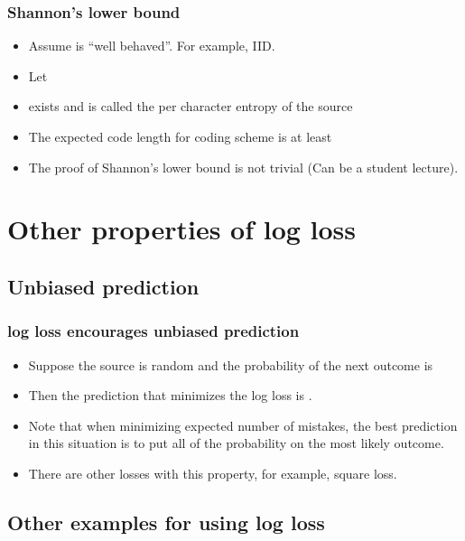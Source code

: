 \documentclass[handout]{beamer}
\begin{document}
\begin{frame}
\frametitle{Shannon's lower bound}
\begin{itemize}
\item Assume  is ``well behaved''. For example, IID.
\item Let 
\item {} exists and is called the per character entropy of the source 
\item The expected code length for  coding scheme is at least 
\R{\[
\paren{1-o(1)} H(p_T) = \paren{1-o(1)}\; T\; H(p)
\]}
\item The proof of Shannon's lower bound is not trivial (Can be a
  student lecture).
\end{itemize}
\end{frame}

\section{Other properties of log loss}

\subsection{Unbiased prediction}
\begin{frame}
\frametitle{log loss encourages unbiased prediction}
\begin{itemize}
\item Suppose the source is random and the probability of the next outcome is  
\item Then the prediction that minimizes the log loss is .
\item Note that when minimizing expected number of mistakes, the best prediction in this situation is to put all of the probability on the
most likely outcome.
\item There are other losses with this property, for example, square loss.
\end{itemize}
\end{frame}

\subsection{Other examples for using log loss}
\end{document}
